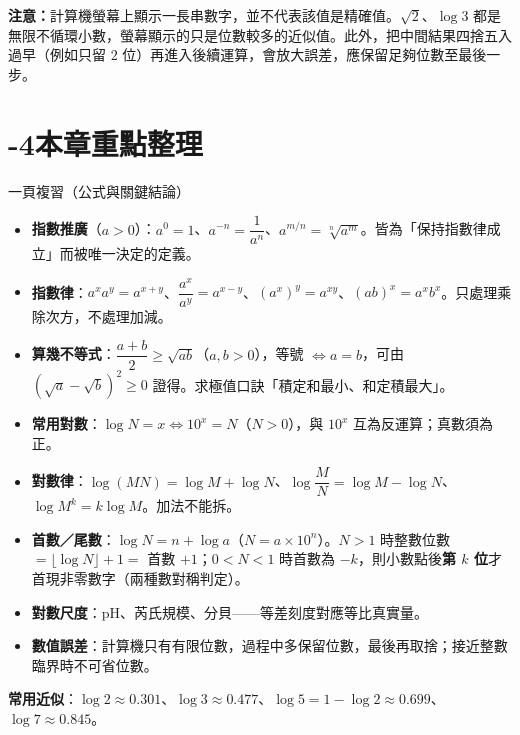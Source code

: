 \documentclass[11pt]{article}
\begin{document}
\textbf{注意：}計算機螢幕上顯示一長串數字，並不代表該值是精確值。$\sqrt2$、$\log3$ 都是無限不循環小數，螢幕顯示的只是位數較多的近似值。此外，把中間結果四捨五入過早（例如只留 $2$ 位）再進入後續運算，會放大誤差，應保留足夠位數至最後一步。

\section*{-4\quad 本章重點整理}

\begin{補充框}{一頁複習（公式與關鍵結論）}
\begin{itemize}\setlength{\itemsep}{2pt}
\item \textbf{指數推廣}（$a>0$）：$a^0=1$、$a^{-n}=\dfrac1{a^n}$、$a^{m/n}=\sqrt[n]{a^m}$。皆為「保持指數律成立」而被唯一決定的定義。
\item \textbf{指數律}：$a^x a^y=a^{x+y}$、$\dfrac{a^x}{a^y}=a^{x-y}$、$(a^x)^y=a^{xy}$、$(ab)^x=a^xb^x$。只處理乘除次方，不處理加減。
\item \textbf{算幾不等式}：$\dfrac{a+b}{2}\ge\sqrt{ab}$（$a,b>0$），等號 $\iff a=b$，可由 $(\sqrt a-\sqrt b)^2\ge0$ 證得。求極值口訣「積定和最小、和定積最大」。
\item \textbf{常用對數}：$\log N=x\iff 10^x=N$（$N>0$），與 $10^x$ 互為反運算；真數須為正。
\item \textbf{對數律}：$\log(MN)=\log M+\log N$、$\log\dfrac MN=\log M-\log N$、$\log M^k=k\log M$。加法不能拆。
\item \textbf{首數／尾數}：$\log N=n+\log a$（$N=a\times10^n$）。$N>1$ 時整數位數 $=\lfloor\log N\rfloor+1=$ 首數 $+1$；$0<N<1$ 時首數為 $-k$，則小數點後\textbf{第 $k$ 位}才首現非零數字（兩種數對稱判定）。
\item \textbf{對數尺度}：pH、芮氏規模、分貝——等差刻度對應等比真實量。
\item \textbf{數值誤差}：計算機只有有限位數，過程中多保留位數，最後再取捨；接近整數臨界時不可省位數。
\end{itemize}
\textbf{常用近似}：$\log2\approx0.301$、$\log3\approx0.477$、$\log5=1-\log2\approx0.699$、$\log7\approx0.845$。
\end{補充框}
\end{document}
